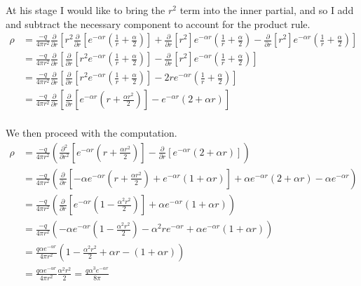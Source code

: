 \documentclass{article}
\begin{document}
At his stage I would like to bring the $r^{2}$ term into the inner partial, and so I add and subtract the necessary component to account for the product rule.
\begin{align*}
	\rho &= \frac{-q}{4\pi r^{2}} \frac{\partial}{\partial r} \left[ r^{2} \frac{\partial}{\partial r} \left[ e^{-\alpha r} \left( \frac{1}{r} + \frac{\alpha}{2} \right) \right] + \frac{\partial}{\partial r} \left[ r^{2} \right] e^{-\alpha r} \left( \frac{1}{r} + \frac{\alpha}{2} \right) - \frac{\partial}{\partial r} \left[ r^{2} \right] e^{-\alpha r} \left( \frac{1}{r} + \frac{\alpha}{2} \right) \right]\\
		&= \frac{-q}{4\pi r^{2}} \frac{\partial}{\partial r} \left[ \frac{\partial}{\partial r} \left[ r^{2}e^{-\alpha r} \left( \frac{1}{r} + \frac{\alpha}{2} \right) \right] - \frac{\partial}{\partial r} \left[ r^{2} \right] e^{-\alpha r} \left( \frac{1}{r} + \frac{\alpha}{2} \right) \right]\\
		&= \frac{-q}{4\pi r^{2}} \frac{\partial}{\partial r} \left[ \frac{\partial}{\partial r} \left[ r^{2}e^{-\alpha r} \left( \frac{1}{r} + \frac{\alpha}{2} \right) \right] - 2r e^{-\alpha r} \left( \frac{1}{r} + \frac{\alpha}{2} \right) \right]\\
		&= \frac{-q}{4\pi r^{2}} \frac{\partial}{\partial r} \left[ \frac{\partial}{\partial r} \left[ e^{-\alpha r} \left( r + \frac{\alpha r^{2}}{2} \right) \right] - e^{-\alpha r} \left( 2 + \alpha r \right) \right]\\
\end{align*}
		
We then proceed with the computation.
\begin{align*}
	\rho &= \frac{-q}{4\pi r^{2}} \left( \frac{\partial^{2}}{\partial r^{2}} \left[ e^{-\alpha r} \left( r + \frac{\alpha r^{2}}{2} \right) \right] - \frac{\partial}{\partial r} \left[ e^{-\alpha r} \left( 2 + \alpha r \right) \right] \right)\\
		&= \frac{-q}{4\pi r^{2}} \left( \frac{\partial}{\partial r} \left[ -\alpha e^{-\alpha r} \left( r + \frac{\alpha r^{2}}{2} \right) + e^{-\alpha r} \left( 1 + \alpha r \right) \right] + \alpha e^{-\alpha r} \left( 2 + \alpha r \right) - \alpha e^{-\alpha r} \right)\\
		&= \frac{-q}{4\pi r^{2}} \left( \frac{\partial}{\partial r} \left[ e^{-\alpha r} \left( 1 - \frac{\alpha^{2} r^{2}}{2} \right) \right] + \alpha e^{-\alpha r} \left( 1 + \alpha r \right) \right)\\
		&= \frac{-q}{4\pi r^{2}} \left( -\alpha e^{-\alpha r} \left( 1 - \frac{\alpha^{2} r^{2}}{2} \right) - \alpha^{2}re^{-\alpha r} + \alpha e^{-\alpha r} \left( 1 + \alpha r \right) \right)\\
		&= \frac{q\alpha e^{-\alpha r}}{4\pi r^{2}} \left( 1 - \frac{\alpha^{2} r^{2}}{2} + \alpha r - \left( 1 + \alpha r \right) \right)\\
		&= \frac{q\alpha e^{-\alpha r}}{4\pi r^{2}} \frac{\alpha^{2} r^{2}}{2} = \boxed{\frac{q\alpha^{3}e^{-\alpha r}}{8\pi}}\\
\end{align*}
\end{document}
